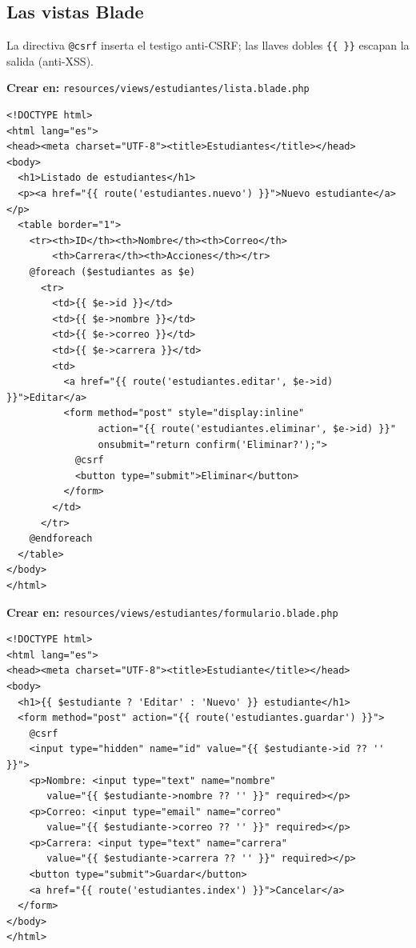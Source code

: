\subsection{Las vistas Blade}
\label{ap:crud:laravel:vistas}

La directiva \texttt{@csrf} inserta el testigo anti-CSRF; las llaves
dobles \texttt{\{\{ \}\}} escapan la salida (anti-XSS).

{\small\textbf{Crear en:} \texttt{resources/views/estudiantes/lista.blade.php}}
\begin{lstlisting}[style=html,caption={lista.blade.php (listado)},label={lst:lv-lista}]
<!DOCTYPE html>
<html lang="es">
<head><meta charset="UTF-8"><title>Estudiantes</title></head>
<body>
  <h1>Listado de estudiantes</h1>
  <p><a href="{{ route('estudiantes.nuevo') }}">Nuevo estudiante</a></p>
  <table border="1">
    <tr><th>ID</th><th>Nombre</th><th>Correo</th>
        <th>Carrera</th><th>Acciones</th></tr>
    @foreach ($estudiantes as $e)
      <tr>
        <td>{{ $e->id }}</td>
        <td>{{ $e->nombre }}</td>
        <td>{{ $e->correo }}</td>
        <td>{{ $e->carrera }}</td>
        <td>
          <a href="{{ route('estudiantes.editar', $e->id) }}">Editar</a>
          <form method="post" style="display:inline"
                action="{{ route('estudiantes.eliminar', $e->id) }}"
                onsubmit="return confirm('Eliminar?');">
            @csrf
            <button type="submit">Eliminar</button>
          </form>
        </td>
      </tr>
    @endforeach
  </table>
</body>
</html>
\end{lstlisting}

{\small\textbf{Crear en:} \texttt{resources/views/estudiantes/formulario.blade.php}}
\begin{lstlisting}[style=html,caption={formulario.blade.php (alta y edicion)},label={lst:lv-form}]
<!DOCTYPE html>
<html lang="es">
<head><meta charset="UTF-8"><title>Estudiante</title></head>
<body>
  <h1>{{ $estudiante ? 'Editar' : 'Nuevo' }} estudiante</h1>
  <form method="post" action="{{ route('estudiantes.guardar') }}">
    @csrf
    <input type="hidden" name="id" value="{{ $estudiante->id ?? '' }}">
    <p>Nombre: <input type="text" name="nombre"
       value="{{ $estudiante->nombre ?? '' }}" required></p>
    <p>Correo: <input type="email" name="correo"
       value="{{ $estudiante->correo ?? '' }}" required></p>
    <p>Carrera: <input type="text" name="carrera"
       value="{{ $estudiante->carrera ?? '' }}" required></p>
    <button type="submit">Guardar</button>
    <a href="{{ route('estudiantes.index') }}">Cancelar</a>
  </form>
</body>
</html>
\end{lstlisting}

